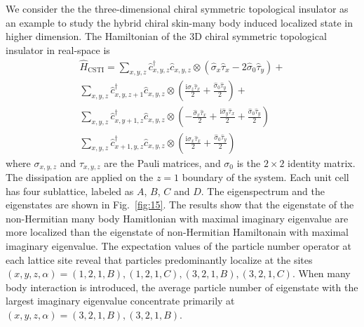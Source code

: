 \documentclass[longbibliography, aps, prx, amsmath, amssymb, amsfonts, twocolumn,superscriptaddress, footinbib]{revtex4-1}
\begin{document}
	We consider the the three-dimensional chiral symmetric topological insulator as an example to study the hybrid chiral skin-many body induced localized state in higher dimension. The Hamiltonian of the 3D chiral symmetric topological insulator in real-space is
	\begin{equation}
		\begin{split}
			\hat{H}_{\text{CSTI}} = \sum_{x,y,z} \hat{c}_{x,y,z}^{\dagger}\hat{c}_{x,y,z} \otimes (\hat{\sigma}_x \hat{\tau}_x - 2 \hat{\sigma}_0 \hat{\tau}_y) + \\
			\sum_{x,y,z} \hat{c}_{x,y,z+1}^{\dagger}\hat{c}_{x,y,z} \otimes ( \frac{\mathrm{i} \hat{\sigma}_z \hat{\tau}_x}{2} + \frac{\hat{\sigma}_0 \hat{\tau}_y}{2}) + \\
			\sum_{x,y,z} \hat{c}_{x,y+1,z}^{\dagger}\hat{c}_{x,y,z} \otimes (-\frac{\hat{\sigma}_x \hat{\tau}_x}{2} + \frac{\mathrm{i} \hat{\sigma}_y \hat{\tau}_x}{2} + \frac{\hat{\sigma}_0 \hat{\tau}_y}{2})\\
			\sum_{x,y,z} \hat{c}_{x+1,y,z}^{\dagger}\hat{c}_{x,y,z} \otimes ( \frac{\mathrm{i}\hat{\sigma}_x \hat{\tau}_x}{2} + \frac{\hat{\sigma}_0 \hat{\tau}_y}{2} )
		\end{split} %
	\end{equation}
	where $\sigma_{x,y,z}$ and $\tau_{x,y,z}$ are the Pauli matrices, and $\sigma_0$ is the $2\times 2$ identity matrix. The dissipation are applied on the $z=1$ boundary of the system. Each unit cell has four sublattice, labeled as $A$, $B$, $C$ and $D$. 
	The eigenspectrum and the eigenstates are shown in Fig.~\ref{fig:15}. The results show that the eigenstate of the non-Hermitian many body Hamitlonian with maximal imaginary eigenvalue are more localized than the eigenstate of non-Hermitian Hamiltonain with maximal imaginary eigenvalue. 
	The expectation values of the particle number operator at each lattice site reveal that particles predominantly localize at the sites $(x,y,z,\alpha)=(1,2,1,B),(1,2,1,C),(3,2,1,B),(3,2,1,C)$. When many body interaction is introduced, the average particle number of eigenstate with the largest imaginary eigenvalue concentrate primarily at $(x,y,z,\alpha)=(3,2,1,B),(3,2,1,B)$. 
\end{document}
